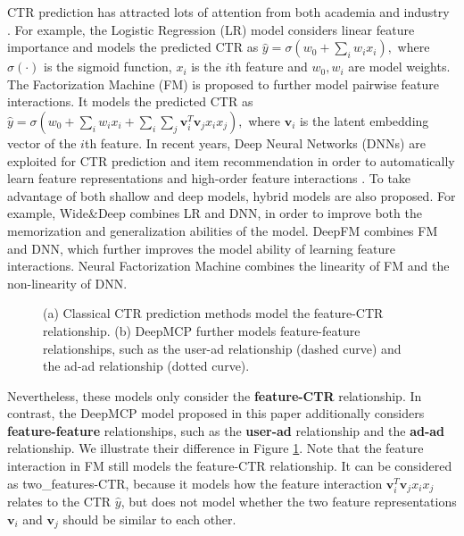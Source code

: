 \documentclass{article}
\begin{document}
CTR prediction has attracted lots of attention from both academia and industry \cite{he2014practical,shan2016deep,guo2017deepfm}.
For example, the Logistic Regression (LR) model \cite{richardson2007predicting} considers linear feature importance and models the predicted CTR as
$
\hat{y} = \sigma (w_0 + \sum_i w_i x_i),
$
where $\sigma(\cdot)$ is the sigmoid function, $x_i$ is the $i$th feature and $w_0, w_i$ are model weights.
The Factorization Machine (FM) \cite{rendle2010factorization} is proposed to further model pairwise feature interactions. It models the predicted CTR as
$
\hat{y} = \sigma (w_0 + \sum_i w_i x_i + \sum_i \sum_j \mathbf{v}_i^T \mathbf{v}_j x_i x_j),
$
where $\mathbf{v}_i$ is the latent embedding vector of the $i$th feature.
In recent years, Deep Neural Networks (DNNs) \cite{lecun2015deep} are exploited for CTR prediction and item recommendation in order to automatically learn feature representations and high-order feature interactions \cite{van2013deep,zhang2016deep,qu2016product,covington2016deep}. To take advantage of both shallow and deep models, hybrid models are also proposed. For example, Wide\&Deep \cite{cheng2016wide} combines LR and DNN, in order to improve both the memorization and generalization abilities of the model.
DeepFM \cite{guo2017deepfm} combines FM and DNN, which further improves the model ability of learning feature interactions.
Neural Factorization Machine \cite{he2017neural} combines the linearity of FM and the non-linearity of DNN.

\begin{figure}[!t]
\centering
{} \hskip 3pt
\vskip -8pt
\caption{(a) Classical CTR prediction methods model the feature-CTR relationship. (b) DeepMCP further models feature-feature relationships, such as the user-ad relationship (dashed curve) and the ad-ad relationship (dotted curve).}
\vskip -10pt
\label{illus}
\end{figure}

Nevertheless, these models only consider the \textbf{feature-CTR} relationship. In contrast, the DeepMCP model proposed in this paper additionally considers \textbf{feature-feature} relationships, such as the \textbf{user-ad} relationship and the \textbf{ad-ad} relationship. We illustrate their difference in Figure \ref{illus}. Note that the feature interaction in FM still models the feature-CTR relationship. It can be considered as two\_features-CTR, because it models how the feature interaction $\mathbf{v}_i^T \mathbf{v}_j x_i x_j$ relates to the CTR $\hat{y}$, but does not model whether the two feature representations $\mathbf{v}_i$ and $\mathbf{v}_j$ should be similar to each other.
\end{document}
